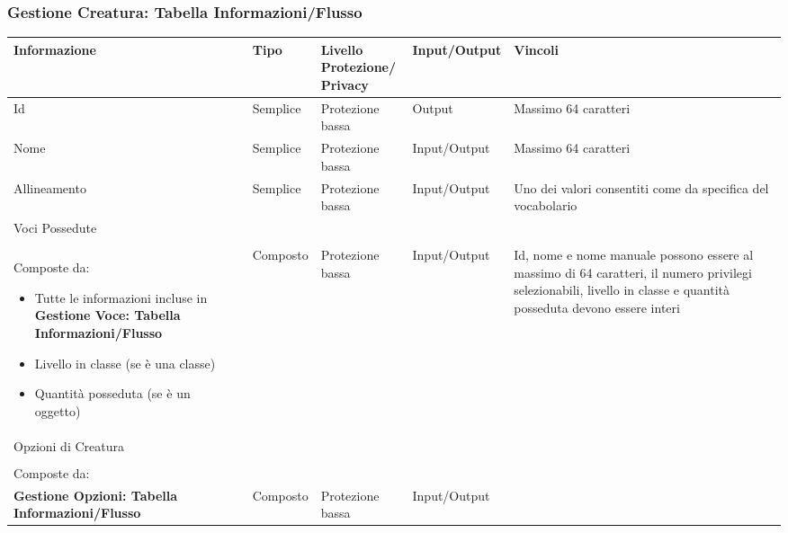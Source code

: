 \documentclass[a4paper, 11pt]{article}
\let\newline\\
\begin{document}
\subsubsection*{Gestione Creatura: Tabella Informazioni/Flusso}
\begin{adjustwidth}{-1.5cm}{-1.5cm}
\begin{center}
    \begin{tabular}{|p{4cm}|p{1.5cm}|p{3cm}|p{2.5cm}|p{4cm}|}
        \hline
        \textbf{Informazione} & \textbf{Tipo} & \textbf{Livello \newline Protezione/\newline Privacy} & \textbf{Input/Output} & \textbf{Vincoli} \\
        \hline
        Id & Semplice & Protezione bassa & Output & Massimo 64 caratteri \\
        \hline
        Nome & Semplice & Protezione bassa & Input/Output & Massimo 64 caratteri \\
        \hline
        Allineamento & Semplice & Protezione bassa & Input/Output & Uno dei valori consentiti come da specifica del vocabolario \\
        \hline
        Voci Possedute \newline \newline Composte da:
        \begin{itemize}
            \item Tutte le informazioni incluse in \textbf{Gestione Voce: Tabella Informazioni/Flusso}
            \item Livello in classe (se è una classe)
            \item Quantità posseduta (se è un oggetto)
        \end{itemize}
        & Composto & Protezione bassa & Input/Output & Id, nome e nome manuale possono essere al massimo di 64 caratteri, il numero privilegi selezionabili, livello in classe e quantità posseduta devono essere interi \\
        \hline
        Opzioni di Creatura \newline \newline Composte da: 
        \begin{itemize}
            \item Tutte le informazioni incluse in \newline \textbf{Gestione Opzioni: Tabella Informazioni/Flusso}
        \end{itemize}& Composto & Protezione bassa & Input/Output &  \\

\end{tabular}
\end{center}
\end{adjustwidth}
\end{document}
